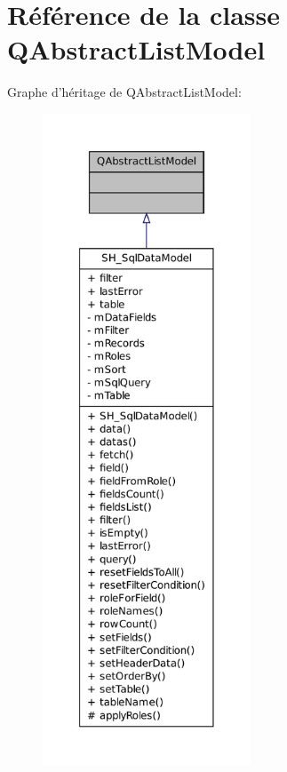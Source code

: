 \hypertarget{classQAbstractListModel}{\section{Référence de la classe Q\-Abstract\-List\-Model}
\label{classQAbstractListModel}
}


Graphe d'héritage de Q\-Abstract\-List\-Model\-:
\nopagebreak
\begin{figure}[H]
\begin{center}
\leavevmode
\includegraphics[height=550pt]{classQAbstractListModel__inherit__graph}
\end{center}
\end{figure}


